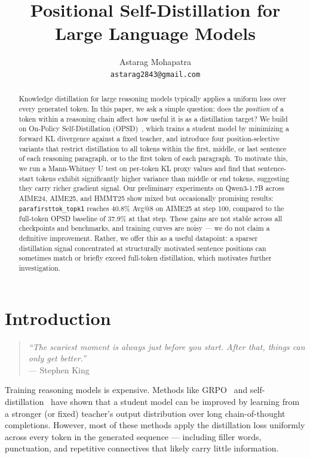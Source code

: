 \documentclass{article}
\title{Positional Self-Distillation for Large Language Models}
\author{
  Astarag Mohapatra \\
  \texttt{astarag2843@gmail.com} \\
}
\begin{document}
\maketitle

\begin{abstract}
Knowledge distillation for large reasoning models typically applies a uniform loss over every generated token.
In this paper, we ask a simple question: does the \emph{position} of a token within a reasoning chain affect how useful it is as a distillation target?
We build on On-Policy Self-Distillation (OPSD)~\cite{opsd2025}, which trains a student model by minimizing a forward KL divergence against a fixed teacher, and introduce four position-selective variants that restrict distillation to all tokens within the first, middle, or last sentence of each reasoning paragraph, or to the first token of each paragraph.
To motivate this, we run a Mann-Whitney U test on per-token KL proxy values and find that sentence-start tokens exhibit significantly higher variance than middle or end tokens, suggesting they carry richer gradient signal.
Our preliminary experiments on Qwen3-1.7B across AIME24, AIME25, and HMMT25 show mixed but occasionally promising results: \texttt{parafirsttok\_topk1} reaches 40.8\% Avg@8 on AIME25 at step 100, compared to the full-token OPSD baseline of 37.9\% at that step.
These gains are not stable across all checkpoints and benchmarks, and training curves are noisy — we do not claim a definitive improvement.
Rather, we offer this as a useful datapoint: a sparser distillation signal concentrated at structurally motivated sentence positions can sometimes match or briefly exceed full-token distillation, which motivates further investigation.
\end{abstract}

\section{Introduction}

\begin{quote}
\textit{``The scariest moment is always just before you start. After that, things can only get better.''}\\
\hfill --- Stephen King
\end{quote}

Training reasoning models is expensive.
Methods like GRPO~\cite{shao2024deepseekmath} and self-distillation~\cite{opsd2025,hubotter2026rl,shenfeld2026continual} have shown that a student model can be improved by learning from a stronger (or fixed) teacher's output distribution over long chain-of-thought completions.
However, most of these methods apply the distillation loss uniformly across every token in the generated sequence — including filler words, punctuation, and repetitive connectives that likely carry little information.
\end{document}
